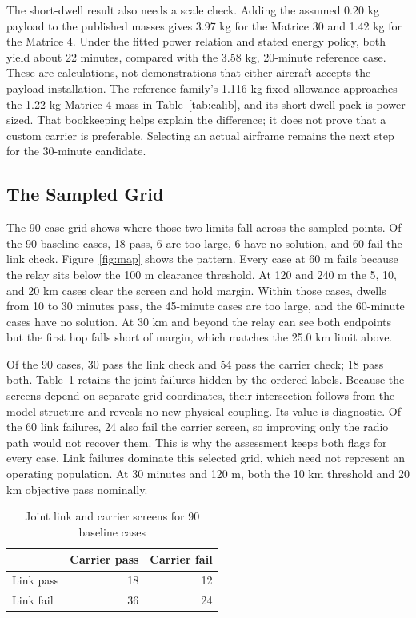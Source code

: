 \documentclass[twocolumn,letterpaper]{IEEEAerospaceCLS}
\begin{document}
The short-dwell result also needs a scale check. Adding the assumed 0.20 kg payload to the published masses gives 3.97 kg for the Matrice 30 and 1.42 kg for the Matrice 4. Under the fitted power relation and stated energy policy, both yield about 22 minutes, compared with the 3.58 kg, 20-minute reference case. These are calculations, not demonstrations that either aircraft accepts the payload installation. The reference family's 1.116 kg fixed allowance approaches the 1.22 kg Matrice 4 mass in Table~\ref{tab:calib}, and its short-dwell pack is power-sized. That bookkeeping helps explain the difference; it does not prove that a custom carrier is preferable. Selecting an actual airframe remains the next step for the 30-minute candidate.

\subsection{The Sampled Grid}

The 90-case grid shows where those two limits fall across the sampled points. Of the 90 baseline cases, 18 pass, 6 are too large, 6 have no solution, and 60 fail the link check. Figure~\ref{fig:map} shows the pattern. Every case at 60 m fails because the relay sits below the 100 m clearance threshold. At 120 and 240 m the 5, 10, and 20 km cases clear the screen and hold margin. Within those cases, dwells from 10 to 30 minutes pass, the 45-minute cases are too large, and the 60-minute cases have no solution. At 30 km and beyond the relay can see both endpoints but the first hop falls short of margin, which matches the 25.0 km limit above.

Of the 90 cases, 30 pass the link check and 54 pass the carrier check; 18 pass both. Table~\ref{tab:joint} retains the joint failures hidden by the ordered labels. Because the screens depend on separate grid coordinates, their intersection follows from the model structure and reveals no new physical coupling. Its value is diagnostic. Of the 60 link failures, 24 also fail the carrier screen, so improving only the radio path would not recover them. This is why the assessment keeps both flags for every case. Link failures dominate this selected grid, which need not represent an operating population. At 30 minutes and 120 m, both the 10 km threshold and 20 km objective pass nominally.


\begin{table}[!tb]
\caption{Joint link and carrier screens for 90 baseline cases}
\label{tab:joint}
\centering\small
\begin{tabular}{@{}lrr@{}}
\toprule
 & Carrier pass & Carrier fail \\
\midrule
Link pass & 18 & 12 \\
Link fail & 36 & 24 \\
\bottomrule
\end{tabular}
\end{table}
\end{document}
